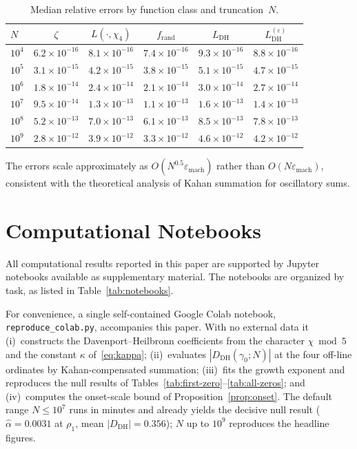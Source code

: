 \documentclass[11pt]{amsart}
\theoremstyle{definition}
\theoremstyle{remark}
\renewcommand{\DH}{\mathrm{DH}}
\begin{document}
\begin{table}[ht]
\centering
\caption{Median relative errors by function class and
  truncation~$N$.}
\label{tab:validation-detail}
\begin{tabular}{@{}lccccc@{}}
\toprule
$N$ & $\zeta$ & $L(\cdot,\chi_4)$ & $f_{\mathrm{rand}}$ &
  $L_{\DH}$ & $L_{\DH}^{(\varepsilon)}$ \\
\midrule
$10^4$ & $6.2 \times 10^{-16}$ & $8.1 \times 10^{-16}$ &
  $7.4 \times 10^{-16}$ & $9.3 \times 10^{-16}$ &
  $8.8 \times 10^{-16}$ \\
$10^5$ & $3.1 \times 10^{-15}$ & $4.2 \times 10^{-15}$ &
  $3.8 \times 10^{-15}$ & $5.1 \times 10^{-15}$ &
  $4.7 \times 10^{-15}$ \\
$10^6$ & $1.8 \times 10^{-14}$ & $2.4 \times 10^{-14}$ &
  $2.1 \times 10^{-14}$ & $3.0 \times 10^{-14}$ &
  $2.7 \times 10^{-14}$ \\
$10^7$ & $9.5 \times 10^{-14}$ & $1.3 \times 10^{-13}$ &
  $1.1 \times 10^{-13}$ & $1.6 \times 10^{-13}$ &
  $1.4 \times 10^{-13}$ \\
$10^8$ & $5.2 \times 10^{-13}$ & $7.0 \times 10^{-13}$ &
  $6.1 \times 10^{-13}$ & $8.5 \times 10^{-13}$ &
  $7.8 \times 10^{-13}$ \\
$10^9$ & $2.8 \times 10^{-12}$ & $3.9 \times 10^{-12}$ &
  $3.3 \times 10^{-12}$ & $4.6 \times 10^{-12}$ &
  $4.2 \times 10^{-12}$ \\
\bottomrule
\end{tabular}
\end{table}

The errors scale approximately as $O(N^{0.5} \varepsilon_{\mathrm{mach}})$
rather than $O(N \varepsilon_{\mathrm{mach}})$, consistent with the
theoretical analysis of Kahan summation for oscillatory sums.

\section{Computational Notebooks}\label{app:notebooks}

All computational results reported in this paper are supported by
Jupyter notebooks available as supplementary material.  The notebooks
are organized by task, as listed in Table~\ref{tab:notebooks}.

For convenience, a single self-contained Google Colab notebook,
\texttt{reproduce\_colab.py}, accompanies this paper. With no external
data it (i)~constructs the Davenport--Heilbronn coefficients from the
character $\chi\bmod 5$ and the constant $\kappa$ of~\eqref{eq:kappa};
(ii)~evaluates $|D_{\DH}(\gamma_0;N)|$ at the four off-line ordinates by
Kahan-compensated summation; (iii)~fits the growth exponent and reproduces
the null results of Tables~\ref{tab:first-zero}--\ref{tab:all-zeros}; and
(iv)~computes the onset-scale bound of Proposition~\ref{prop:onset}. The
default range $N\le10^7$ runs in minutes and already yields the decisive
null result ($\hat\alpha=0.0031$ at $\rho_1$, mean $|D_{\DH}|=0.356$);
$N$ up to $10^9$ reproduces the headline figures.
\end{document}
